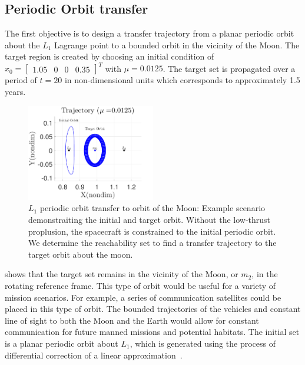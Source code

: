 \documentclass[smallcondensed]{svjour3}
\begin{document}
\subsection{Periodic Orbit transfer}\label{sec:periodic_orbit_transfer}
The first objective is to design a transfer trajectory from a planar periodic orbit about the \( L_1\) Lagrange point to a bounded orbit in the vicinity of the Moon.
The target region is created by choosing an initial condition of \( x_0 = \begin{bmatrix}1.05 & 0 & 0 & 0.35 \end{bmatrix}^T \) with \( \mu = 0.0125 \).
The target set is propagated over a period of \( t = \num{20} \) in non-dimensional units which corresponds to approximately \num{1.5} years.
\begin{figure}[htbp]
   \centering
   \includegraphics[width=0.5\textwidth]{moon_orbit} %
   \caption{\(L_1\) periodic orbit transfer to orbit of the Moon: Example scenario demonstraiting the initial and target orbit.
   Without the low-thrust proplusion, the spacecraft is constrained to the initial periodic orbit. 
   We determine the reachability set to find a transfer trajectory to the target orbit about the moon.}
   \label{fig:moon_orbit}
\end{figure}
 shows that the target set remains in the vicinity of the Moon, or \( m_2\), in the rotating reference frame. 
This type of orbit would be useful for a variety of mission scenarios.
For example, a series of communication satellites could be placed in this type of orbit. 
The bounded trajectories of the vehicles and constant line of sight to both the Moon and the Earth would allow for constant communication for future manned missions and potential habitats.
The initial set is a planar periodic orbit about \( L_1\), which is generated using the process of differential correction of a linear approximation~\cite{koon2011}.
\end{document}
